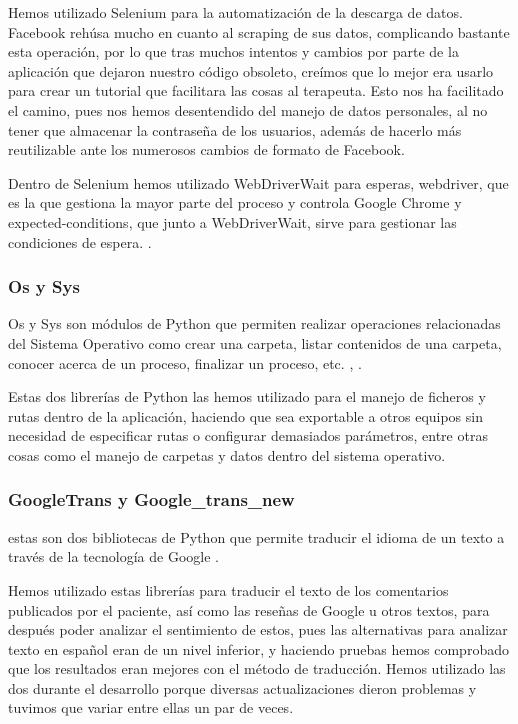  		   	Hemos utilizado Selenium para la automatización de la descarga de datos. Facebook rehúsa mucho en cuanto al scraping de sus datos, complicando bastante esta operación, por lo que tras muchos intentos y cambios por parte de la aplicación que dejaron nuestro código obsoleto, creímos que lo mejor era usarlo para crear un tutorial que facilitara las cosas al terapeuta. Esto nos ha facilitado el camino, pues nos hemos desentendido del manejo de datos personales, al no tener que almacenar la contraseña de los usuarios, además de hacerlo más reutilizable ante los numerosos cambios de formato de Facebook. 
 		   
 		   	Dentro de Selenium hemos utilizado WebDriverWait para esperas, webdriver, que es la que gestiona la mayor parte del proceso y controla Google Chrome y expected-conditions, que junto a WebDriverWait, sirve para gestionar las condiciones de espera. \citep{tutorialWebDriver}.
 		  
 		\subsubsection*{Os y Sys}
 			Os y Sys son módulos de Python que permiten realizar operaciones relacionadas del Sistema Operativo como crear una carpeta, listar contenidos de una carpeta, conocer acerca de un proceso, finalizar un proceso, etc. \citep{os}, \citep{sys}.   
 		
 		   	Estas dos librerías de Python las hemos utilizado para el manejo de ficheros y rutas dentro de la aplicación, haciendo que sea exportable a otros equipos sin necesidad de especificar rutas o configurar demasiados parámetros, entre otras cosas como el manejo de carpetas y datos dentro del sistema operativo.
 		   	
 		\subsubsection*{GoogleTrans y Google\_trans\_new}
 			estas son dos bibliotecas de Python que permite traducir el idioma de un texto a través de la tecnología de Google \citep{trans}.  
 		 
 		   	Hemos utilizado estas librerías para traducir el texto de los comentarios publicados por el paciente, así como las reseñas de Google u otros textos, para después poder analizar el sentimiento de estos, pues las alternativas para analizar texto en español eran de un nivel inferior, y haciendo pruebas hemos comprobado que los resultados eran mejores con el método de traducción. Hemos utilizado las dos durante el desarrollo porque diversas actualizaciones dieron problemas y tuvimos que variar entre ellas un par de veces.
 		   	
